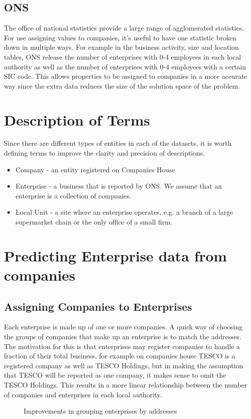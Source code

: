 \documentclass[a4paper,10pt]{article}
\begin{document}
\subsection{ONS}
The office of national statistics provide a large range of agglomerated statistics. For use assigning values to companies, it's useful to have one statistic broken down in multiple ways. For example in the business activity, size and location tables, ONS release the number of enterprises with 0-4 employees in each local authority as well as the number of enterprises with 0-4 employees with a certain SIC code. This allows properties to be assigned to companies in a more accurate way since the extra data reduces the size of the solution space of the problem.

\section{Description of Terms}
Since there are different types of entities in each of the datasets, it is worth defining terms to improve the clarity and precision of descriptions.
\begin{itemize}
 \item Company - an entity registered on Companies House
 \item Enterprise - a business that is reported by ONS. We assume that an enterprise is a collection of companies.
 \item Local Unit - a site where an enterprise operates, e.g. a branch of a large supermarket chain or the only office of a small firm.
\end{itemize}
\section{Predicting Enterprise data from companies}
\subsection{Assigning Companies to Enterprises}
Each enterprise is made up of one or more companies. A quick way of choosing the groups of companies that make up an enterprise is to match the addresses. The motivation for this is that enterprises may register companies to handle a fraction of their total business, for example on companies house TESCO is a registered company as well as TESCO Holdings, but in making the assumption that TESCO will be reported as one company, it makes sense to omit the TESCO Holdings. This results in a more linear relationship between the number of companies and enterprises in each local authority.
\begin{figure}[!ht]
 \caption{Improvements in grouping enterprises by addresses}
\end{figure}
\end{document}
